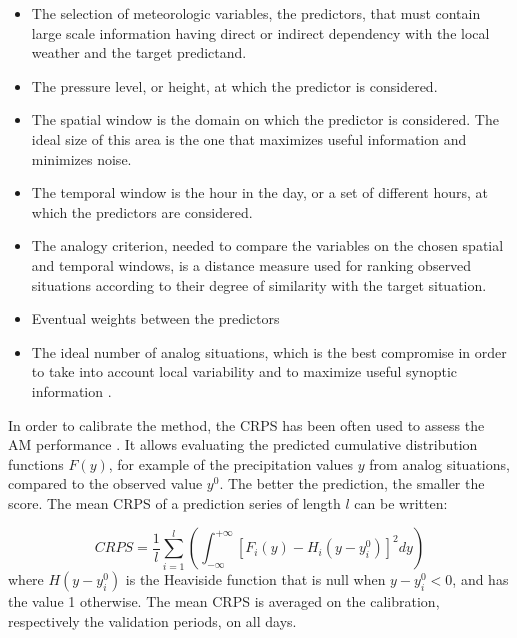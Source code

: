 \documentclass{ametsoc}
\begin{document}
\begin{itemize}
	\item The selection of meteorologic variables, the predictors, that must contain large scale information having direct or indirect dependency with the local weather and the target predictand.
	\item The pressure level, or height, at which the predictor is considered.
	\item The spatial window is the domain on which the predictor is considered. The ideal size of this area is the one that maximizes useful information and minimizes noise.
	\item The temporal window is the hour in the day, or a set of different hours, at which the predictors are considered.
	\item The analogy criterion, needed to compare the variables on the chosen spatial and temporal windows, is a distance measure used for ranking observed situations according to their degree of similarity with the target situation.
	\item Eventual weights between the predictors \cite[e.g.][]{Horton2012a, Junk2015}
	\item The ideal number of analog situations, which is the best compromise in order to take into account local variability and to maximize useful synoptic information \citep{Bontron2004}.
\end{itemize}

In order to calibrate the method, the CRPS \citep[Continuous Ranked Probability Score,][]{Brown1974, Matheson1976, Hersbach2000} has been often used to assess the AM performance \citep[see, e.g.,][]{Bontron2004, Bontron2005, BenDaoud2008, Horton2012, Marty2012, Radanovics2013, Chardon2014, Junk2015, BenDaoud2016, Caillouet2016}. It allows evaluating the predicted cumulative distribution functions $F(y)$, for example of the precipitation values $y$ from analog situations, compared to the observed value $y^{0}$. The better the prediction, the smaller the score. The mean CRPS of a prediction series of length $l$ can be written:

\begin{equation}
\label{eq:CRPS}
CRPS = \frac{1}{l} \sum_{i=1}^{l} \left(  \int_{-\infty}^{+\infty} \left[ F_{i}(y)-H_{i}(y-y_{i}^{0})\right]^{2} dy \right) 
\end{equation}
where $H(y-y_{i}^{0})$ is the Heaviside function that is null when $y-y_{i}^{0}<0$, and has the value 1 otherwise. The mean CRPS is averaged on the calibration, respectively the validation periods, on all days.
\end{document}
